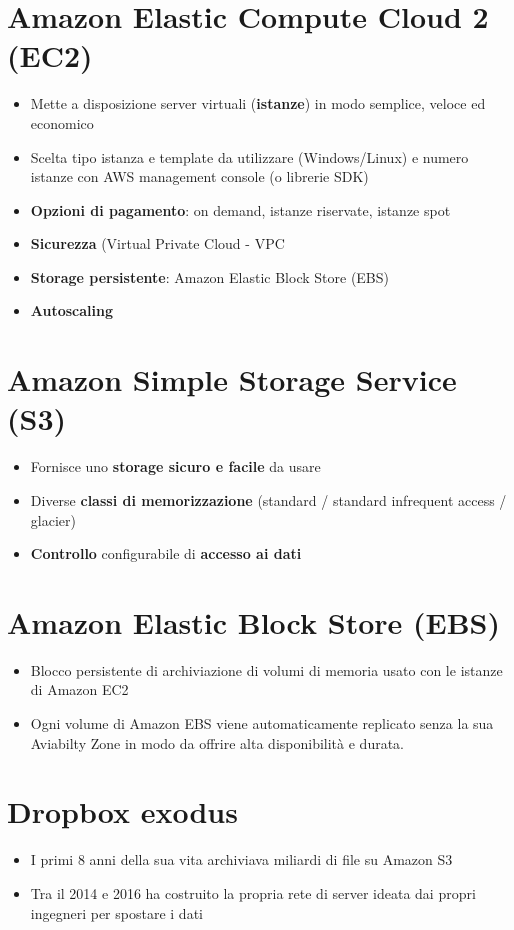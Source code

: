 \documentclass[a4paper, 12pt]{report}
\begin{document}
      \section{Amazon Elastic Compute Cloud 2 (EC2)}
      \begin{itemize}
        \item Mette a disposizione server virtuali (\textbf{istanze}) in modo semplice, veloce ed economico 
        \item Scelta tipo istanza e template da utilizzare (Windows/Linux) e numero istanze
        con AWS management console (o librerie SDK)
        \item \textbf{Opzioni di pagamento}: on demand, istanze riservate, istanze spot
        \item \textbf{Sicurezza} (Virtual Private Cloud - VPC
        \item \textbf{Storage persistente}: Amazon Elastic Block Store (EBS)
        \item \textbf{Autoscaling}
      \end{itemize}
      \section{Amazon Simple Storage Service (S3)}
      \begin{itemize}
        \item Fornisce uno \textbf{storage sicuro e facile} da usare
        \item Diverse \textbf{classi di memorizzazione} (standard / standard infrequent access / glacier)
        \item \textbf{Controllo} configurabile di \textbf{accesso ai dati}
      \end{itemize}
      \section{Amazon Elastic Block Store (EBS)}
      \begin{itemize}
        \item Blocco persistente di archiviazione di volumi di memoria usato con le istanze di Amazon EC2
        \item Ogni volume di Amazon EBS viene automaticamente replicato senza la sua Aviabilty Zone in modo da offrire alta disponibilità e durata. 
      \end{itemize}
      \section{Dropbox exodus}
        \begin{itemize}
          \item I primi 8 anni della sua vita archiviava miliardi di file su Amazon S3
          \item Tra il 2014 e 2016 ha costruito la propria rete di server ideata dai propri ingegneri per spostare i dati
        \end{itemize}
\end{document}
